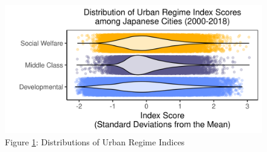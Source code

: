 \documentclass[preprint, 3p,
authoryear]{elsarticle} %
\begin{document}
\singlespacing

\newpage

\begin{landscape}

\setcounter{table}{0}
\renewcommand{\thetable}{A\arabic{table}}
\setcounter{figure}{0}
\renewcommand{\thefigure}{A\arabic{figure}}

\begin{figure}
\includegraphics[width=1\linewidth]{viz/distribution} \caption{Figure \ref{fig:figure_A1}: \label{fig:figure_A1}{Distributions of Urban Regime Indices}}\label{fig:figure_A1}
\end{figure}

\end{landscape}
\end{document}
